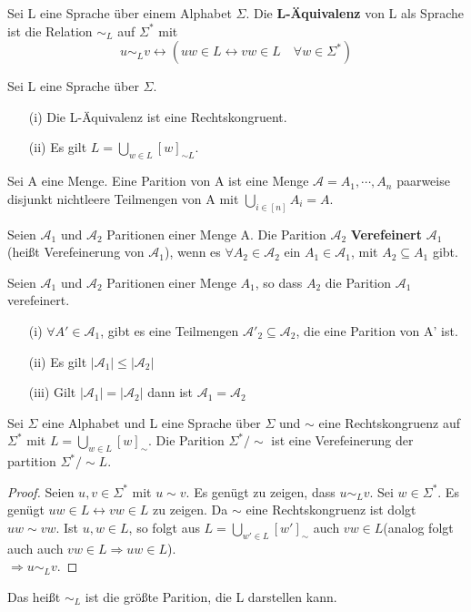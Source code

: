   Sei L eine Sprache über einem Alphabet \(\Sigma\). Die \textbf{L-Äquivalenz} von L als Sprache ist die Relation \(\sim_L\) auf \(\Sigma^*\) mit 
  \[
    u \sim_L v \leftrightarrow (uw \in L \leftrightarrow vw \in L \quad \forall w \in \Sigma^*)
  \] 

  Sei L eine Sprache über \(\Sigma\). 
  \begin{itemize}
    \item [(i)] Die L-Äquivalenz ist eine Rechtskongruent.
    \item [(ii)] Es gilt \(L = \bigcup \limits_{w \in L}[w]_{\sim L}\).
  \end{itemize}

  Sei A eine Menge. Eine Parition von A ist eine Menge \(\mathcal{A} = {A_1, \cdots, A_n}\) paarweise disjunkt nichtleere Teilmengen von A mit \(\bigcup \limits_{i \in [n]} A_i = A\).

  Seien \(\mathcal{A}_1\) und \(\mathcal{A}_2\) Paritionen einer Menge A. Die Parition \(\mathcal{A}_2\) \textbf{Verefeinert} \(\mathcal{A}_1\) (heißt Verefeinerung von \(\mathcal{A}_1\)), wenn es \(\forall A_2 \in \mathcal{A}_2\) ein \(A_1 \in \mathcal{A}_1\), mit \(A_2 \subseteq A_1\) gibt.

  Seien \(\mathcal{A}_1\) und \(\mathcal{A}_2\) Paritionen einer Menge \(A_1\), so dass \(A_2\) die Parition \(\mathcal{A}_1\) verefeinert.
  \begin{itemize}
    \item [(i)] \(\forall A' \in \mathcal{A}_1\), gibt es eine Teilmengen \(\mathcal{A}'_2 \subseteq \mathcal{A}_2\), die eine Parition von A' ist.
    \item [(ii)] Es gilt \(|\mathcal{A}_1| \leq |\mathcal{A}_2|\)
    \item [(iii)] Gilt \(|\mathcal{A}_1| = |\mathcal{A}_2|\) dann ist \(\mathcal{A}_1 = \mathcal{A}_2\)
  \end{itemize}

  Sei \(\Sigma\) eine Alphabet und L eine Sprache über \(\Sigma\) und \(\sim\) eine Rechtskongruenz auf \(\Sigma^*\) mit \(L = \bigcup \limits_{w \in L} [w]_{\sim}\). Die Parition \(\Sigma^*/\sim\) ist eine Verefeinerung der partition \(\Sigma^*/ \sim L\).
  \begin{proof}
    Seien \(u, v \in \Sigma^*\) mit \(u \sim v\). Es genügt zu zeigen, dass \(u \sim_{L} v\). Sei \(w \in \Sigma^*\). Es genügt \(uw \in L \leftrightarrow vw \in L\) zu zeigen. Da \(\sim\) eine Rechtskongruenz ist dolgt \(uw \sim vw\). Ist \(u, w \in L\), so folgt aus \(L = \bigcup \limits_{w' \in L} [w']_\sim\) auch \(vw \in L\)(analog folgt auch auch \(vw \in L \Rightarrow uw \in L\)).\\ \(\Rightarrow u \sim_L v\).
  \end{proof}
  Das heißt \(\sim_L\) ist die größte Parition, die L darstellen kann.

